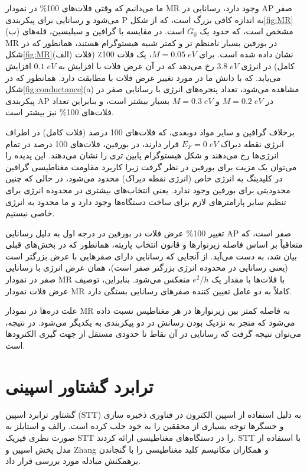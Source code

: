 ما ‌‌می‌‌دانیم که وقتی فلات‌های 100\% در نمودار \gls{MR} وجود دارد، رسانایی در \gls{AP} صفر ‌‌می‌‌شود و رسانایی برای پیکربندی \gls{P} به اندازه کافی بزرگ است، که از شکل\ref{fig:MR}(ب) مشخص است، که حدود یک $G_0$ است. در مقایسه با گرافین و سیلیسین، قله‌های \gls{MR} در ‌بورفین بسیار نامنظم تر و کمتر شبیه هیستوگرام هستند، همانطور که در شکل\ref{fig:MR}(الف) نشان داده شده است. برای $M = 0.05\; eV$، یک فلات 100٪ (فلات کامل) در انرژی $3.8\; eV$ رخ ‌‌می‌‌دهد که در آن عرض فلات با افزایش  به $0.1\; eV$ افزایش ‌‌می‌‌یابد. که با دانش ما در مورد تغییر عرض فلات با  مطابقت دارد.
همانطور که در شکل\ref{fig:conductance}(a) مشاهده ‌‌می‌‌شود، تعداد پنجره‌های انرژی با رسانایی صفر در پیکربندی \gls{AP} در $M = 0.2\; eV$ و $M = 0.3\; eV$ بسیار بیشتر است، و بنابراین تعداد فلات‌های 100\% نیز بیشتر است. 

برخلاف گرافین و سایر مواد دوبعدی، که فلات‌های 100 درصد (فلات کامل) در اطراف انرژی نقطه دیراک $E_F = 0\; eV$ قرار دارند، در ‌بورفین، فلات‌های 100 درصد در تمام انرژی‌ها رخ ‌‌می‌‌دهند و شکل هیستوگرام پایین تری را نشان ‌‌می‌‌دهند. این پدیده را ‌‌می‌‌توان یک مزیت برای ‌بورفین در نظر گرفت زیرا کاربرد مقاومت مغناطیسی گرافین در کلیدینگ به انرژی خاص (انرژی نقطه دیراک) محدود ‌‌می‌‌شود، در حالی که چنین محدودیتی برای ‌بورفین وجود ندارد. یعنی انتخاب‌های بیشتری در محدوده انرژی برای تنظیم سایر پارامترهای لازم برای ساخت دستگاه‌ها وجود دارد و ما محدود به انرژی خاصی نیستیم.

تغییر 100\% عرض فلات در ‌بورفین در درجه اول به دلیل رسانایی \gls{AP} صفر است، که متعاقباً بر اساس فاصله زیر‌نوارها و قانون انتخاب پاریته، همانطور که در بخش‌های قبلی بیان شد، به دست ‌‌می‌‌آید. از آنجایی که رسانایی دارای صفرهایی با عرض بزرگتر است (یعنی رسانایی در محدوده انرژی بزرگتر صفر است)، همان عرض انرژی با رسانایی صفر در نمودار \gls{MR} با فلات‌ها با مقدار یک $e^2/h$ منعکس ‌‌می‌‌شود. بنابراین، توصیف عرض فلات نمودار \gls{MR} کاملاً به دو عامل تعیین کننده صفرهای رسانایی بستگی دارد. 

علت دره‌ها در نمودار \gls{MR} به فاصله کمتر بین زیر‌نوارها در هر مغناطیس نسبت داده ‌‌می‌‌شود که منجر به نزدیک بودن رسانش در دو پیکربندی به یکدیگر ‌‌می‌‌شود. در نتیجه، ‌‌می‌‌توان نتیجه گرفت که رسانایی در آن نقاط تا حدودی مستقل از جهت گیری الکترودها است.
\section{ترابرد گشتاور اسپینی}
گشتاور ترابرد اسپین (\gls{STT}) به دلیل استفاده از اسپین الکترون در فناوری ذخیره سازی و حسگرها توجه بسیاری از محققین را به خود جلب کرده است. رالف و استایلز به صورت نظری فیزیک \gls{STT} را در دستگاه‌های مغناطیسی ارائه کردند. \gls{STT} با استفاده از مدل پخش اسپین  \cite{abertFieldandDampinglikeSpintransfer2017} و \gls{Zhang} و همکاران مکانیسم کلید مغناطیسی را با گنجاندن برهمکنش مبادله \cite{zhangMechanismsSpinpolarizedCurrentdriven2002} مورد بررسی قرار داد. 

